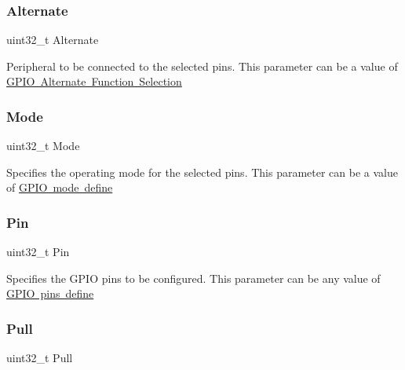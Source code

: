 \subsubsection{\texorpdfstring{Alternate}{Alternate}}
{\footnotesize\ttfamily uint32\+\_\+t Alternate}

Peripheral to be connected to the selected pins. This parameter can be a value of \mbox{\hyperlink{group___g_p_i_o___alternate__function__selection}{G\+P\+IO Alternate Function Selection}} \mbox{\label{struct_g_p_i_o___init_type_def_a0ffc93ec511ed9cf1663f6939bd3e839}} 
\subsubsection{\texorpdfstring{Mode}{Mode}}
{\footnotesize\ttfamily uint32\+\_\+t Mode}

Specifies the operating mode for the selected pins. This parameter can be a value of \mbox{\hyperlink{group___g_p_i_o__mode__define}{G\+P\+IO mode define}} \mbox{\label{struct_g_p_i_o___init_type_def_a871d0ab74071724e96b7cc9ae2a7532b}} 
\subsubsection{\texorpdfstring{Pin}{Pin}}
{\footnotesize\ttfamily uint32\+\_\+t Pin}

Specifies the G\+P\+IO pins to be configured. This parameter can be any value of \mbox{\hyperlink{group___g_p_i_o__pins__define}{G\+P\+IO pins define}} \mbox{\label{struct_g_p_i_o___init_type_def_a6cdde08eb507b710f8179a4326548e26}} 
\subsubsection{\texorpdfstring{Pull}{Pull}}
{\footnotesize\ttfamily uint32\+\_\+t Pull}

